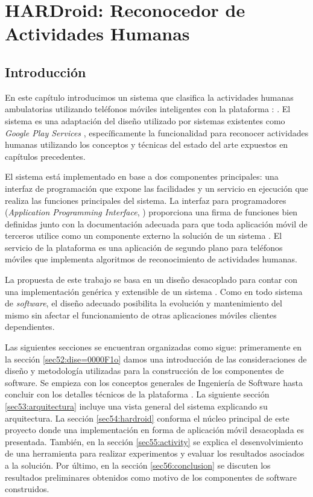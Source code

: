 
\chapter{HARDroid: Reconocedor de Actividades Humanas}

\label{chap5:hardroid}

\section{Introducción}

\label{sec51:intro}En este capítulo introducimos un sistema que clasifica
la actividades humanas ambulatorias utilizando teléfonos móviles inteligentes
con la plataforma \emph{\texttrademark}: \emph{}.
El sistema es una adaptación del diseño utilizado por sistemas existentes
como \emph{Google Play Services} \cite{Google2013l}, específicamente
la funcionalidad para reconocer actividades humanas utilizando los
conceptos y técnicas del estado del arte expuestos en capítulos precedentes. 

El sistema \emph{} está implementado en base a dos
componentes principales: una interfaz de programación que expone las
facilidades y un servicio en ejecución que realiza las funciones principales
del sistema. La interfaz para programadores (\emph{Application Programming
Interface}, ) proporciona una firma de funciones bien definidas
junto con la documentación adecuada para que toda aplicación móvil
de terceros utilice como un componente externo la solución de un sistema
. El servicio de la plataforma \emph{} es
una aplicación de segundo plano para teléfonos móviles que implementa
algoritmos de reconocimiento de actividades humanas.

La propuesta de este trabajo se basa en un diseño desacoplado para
contar con una implementación genérica y extensible de un sistema
. Como en todo sistema de \emph{software}, el diseño adecuado
posibilita la evolución y mantenimiento del mismo sin afectar el funcionamiento
de otras aplicaciones móviles clientes dependientes. 

Las siguientes secciones se encuentran organizadas como sigue: primeramente
en la sección \ref{sec52:dise=0000F1o} damos una introducción de
las consideraciones de diseño y metodología utilizadas para la construcción
de los componentes de software. Se empieza con los conceptos generales
de Ingeniería de Software hasta concluir con los detalles técnicos
de la plataforma \emph{}. La siguiente sección \ref{sec53:arquitectura}
incluye una vista general del sistema explicando su arquitectura.
La sección \ref{sec54:hardroid} conforma el núcleo principal de este
proyecto donde una implementación  en forma de aplicación
móvil desacoplada es presentada. También, en la sección \ref{sec55:activity}
se explica el desenvolvimiento de una herramienta para realizar experimentos
y evaluar los resultados asociados a la solución. Por último, en la
sección \ref{sec56:conclusion} se discuten los resultados preliminares
obtenidos como motivo de los componentes de software construidos.

